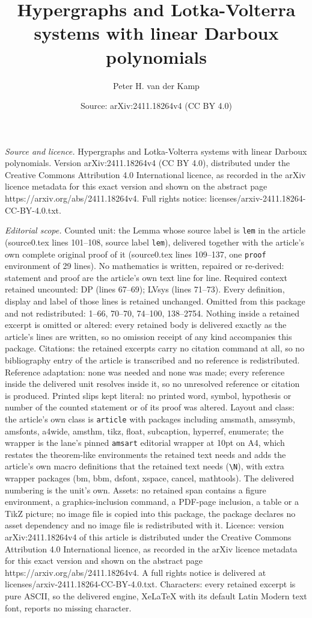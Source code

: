 \documentclass[10pt,a4paper]{amsart}
\title[Hypergraphs and Lotka-Volterra systems with linear Darboux p]{Hypergraphs and Lotka-Volterra systems with linear Darboux polynomials}
\author{Peter H. van der Kamp}
\date{Source: arXiv:2411.18264v4 (CC BY 4.0)}
\begin{document}
\maketitle

\noindent\emph{Source and licence.} Hypergraphs and Lotka-Volterra systems with linear Darboux polynomials. Version arXiv:2411.18264v4 (CC BY 4.0), distributed under the Creative Commons Attribution 4.0 International licence, as recorded in the arXiv licence metadata for this exact version and shown on the abstract page https://arxiv.org/abs/2411.18264v4. Full rights notice: licenses/arxiv-2411.18264-CC-BY-4.0.txt.\par\smallskip

\noindent\textit{Editorial scope.} Counted unit: the Lemma whose source label is \texttt{lem} in the article (source0.tex lines 101--108, source label \texttt{lem}), delivered together with the article's own complete original proof of it (source0.tex lines 109--137, one \texttt{proof} environment of 29 lines). No mathematics is written, repaired or re-derived: statement and proof are the article's own text line for line. Required context retained uncounted: DP (lines 67--69); LVsys (lines 71--73). Every definition, display and label of those lines is retained unchanged. Omitted from this package and not redistributed: 1--66, 70--70, 74--100, 138--2754. Nothing inside a retained excerpt is omitted or altered: every retained body is delivered exactly as the article's lines are written, so no omission receipt of any kind accompanies this package. Citations: the retained excerpts carry no citation command at all, so no bibliography entry of the article is transcribed and no reference is redistributed. Reference adaptation: none was needed and none was made; every reference inside the delivered unit resolves inside it, so no unresolved reference or citation is produced. Printed slips kept literal: no printed word, symbol, hypothesis or number of the counted statement or of its proof was altered. Layout and class: the article's own class is \texttt{article} with packages including amsmath, amssymb, amsfonts, a4wide, amsthm, tikz, float, subcaption, hyperref, enumerate; the wrapper is the lane's pinned \texttt{amsart} editorial wrapper at 10pt on A4, which restates the theorem-like environments the retained text needs and adds the article's own macro definitions that the retained text needs (\texttt{\textbackslash N}), with extra wrapper packages (bm, bbm, dsfont, xspace, cancel, mathtools). The delivered numbering is the unit's own. Assets: no retained span contains a figure environment, a graphics-inclusion command, a PDF-page inclusion, a table or a TikZ picture; no image file is copied into this package, the package declares no asset dependency and no image file is redistributed with it. Licence: version arXiv:2411.18264v4 of this article is distributed under the Creative Commons Attribution 4.0 International licence, as recorded in the arXiv licence metadata for this exact version and shown on the abstract page https://arxiv.org/abs/2411.18264v4. A full rights notice is delivered at licenses/arxiv-2411.18264-CC-BY-4.0.txt. Characters: every retained excerpt is pure ASCII, so the delivered engine, XeLaTeX with its default Latin Modern text font, reports no missing character.
\end{document}
